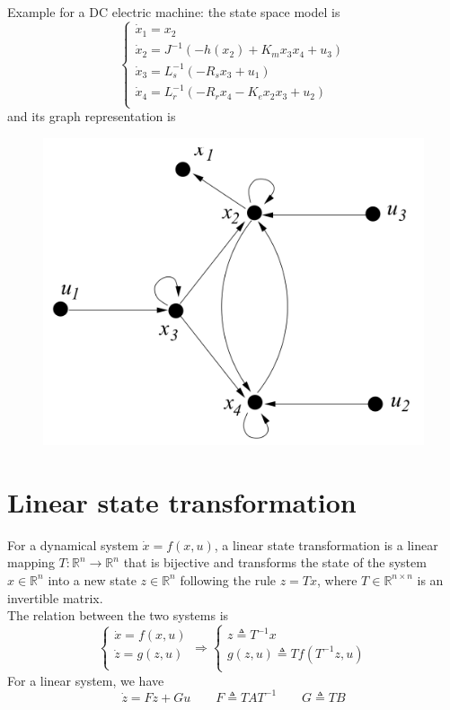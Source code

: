 \documentclass[12pt, openany]{report}
\theoremstyle{definition}
\newcommand{\R}{\mathbb{R}}
\begin{document}
Example for a DC electric machine: the state space model is 
\begin{equation}
    \begin{cases}
        \dot x_1 = x_2\\
        \dot x_2 = J^{-1}(-h(x_2)+K_mx_3x_4+u_3)\\
        \dot x_3 = L_s^{-1}(-R_sx_3+u_1)\\
        \dot x_4 = L_r^{-1}(-R_rx_4-K_ex_2x_3+u_2)\\
    \end{cases}
\end{equation}
and its graph representation is 
\begin{figure}[H]
    \centering
    \includegraphics[width = .5\textwidth]{img/graph.png}
\end{figure}
\section{Linear state transformation}
For a dynamical system \(\dot x=f(x,u)\), a linear state transformation is a linear mapping \(T:\R^n\rightarrow \R^n\) that is bijective and transforms the state of the system \(x\in \R^n\) into a new state \(z\in \R^n\) following the rule \(z=Tx\), where \(T\in \R^{n\times n}\) is an invertible matrix. \\
The relation between the two systems is
\begin{equation}
    \begin{cases}
        \dot x=f(x,u)\\
        \dot z = g(z,u)\\
    \end{cases} \Longrightarrow \begin{cases}
        z\triangleq T^{-1}x\\
        g(z,u) \triangleq Tf(T^{-1}z,u)\\
    \end{cases}
\end{equation}
For a linear system, we have 
\begin{equation}
    \dot z = Fz+Gu \qquad F\triangleq TAT^{-1} \qquad G\triangleq TB
\end{equation}
\end{document}
